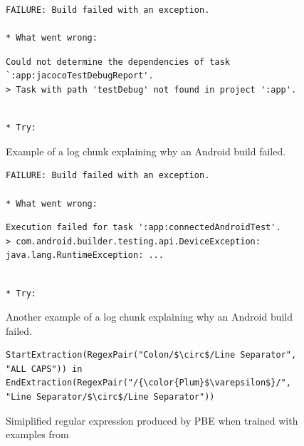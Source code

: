 \begin{figure}[!t]
  \centering
  \begin{lstlisting}[breaklines=true,frame=tlr]
FAILURE: Build failed with an exception.

* What went wrong:
  \end{lstlisting}
  \vspace{-\baselineskip}
  \begin{lstlisting}[backgroundcolor=\color{Cerulean!60},breaklines=true,frame=rl]
Could not determine the dependencies of task `:app:jacocoTestDebugReport'.
> Task with path 'testDebug' not found in project ':app'.
  \end{lstlisting}
  \vspace{-\baselineskip}
  \begin{lstlisting}[breaklines=true,frame=blr]

* Try:
  \end{lstlisting}
  \caption{Example of a log chunk explaining why an Android
  build failed.}
  \label{lst:chunk-example-1}
\end{figure}

\begin{figure}[!t]
  \centering
  \begin{lstlisting}[breaklines=true,frame=tlr]
FAILURE: Build failed with an exception.

* What went wrong:
  \end{lstlisting}
  \vspace{-\baselineskip}
  \begin{lstlisting}[backgroundcolor=\color{Cerulean!60},breaklines=true,frame=rl]
Execution failed for task ':app:connectedAndroidTest'.
> com.android.builder.testing.api.DeviceException:
java.lang.RuntimeException: ...
  \end{lstlisting}
  \vspace{-\baselineskip}
  \begin{lstlisting}[breaklines=true,frame=blr]

* Try:
  \end{lstlisting}
  \caption{Another example of a log chunk explaining why an Android
  build failed.}
  \label{lst:chunk-example-2}
\end{figure}

\begin{figure}[!t]
  \centering
  \begin{lstlisting}[breaklines=true]
StartExtraction(RegexPair("Colon/$\circ$/Line Separator",
"ALL CAPS")) in EndExtraction(RegexPair("/{\color{Plum}$\varepsilon$}/",
"Line Separator/$\circ$/Line Separator"))
  \end{lstlisting}
  \caption{Simiplified regular expression produced by PBE when trained
  with examples from }
  \label{lst:prose-program-simplified}
\end{figure}

